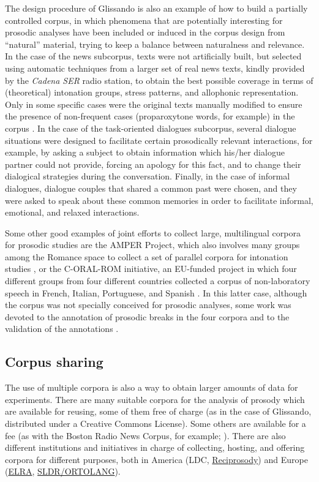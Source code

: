 \documentclass[output=paper]{langsci/langscibook}
\begin{document}
The design procedure of Glissando is also an example of how to build a partially controlled corpus, in which phenomena that are potentially interesting for prosodic analyses have been included or induced in the corpus design from ``natural'' material, trying to keep a balance between naturalness and relevance. In the case of the news subcorpus, texts were not artificially built, but selected using automatic techniques from a larger set of real news texts, kindly provided by the \textit{Cadena SER} radio station, to obtain the best possible coverage in terms of (theoretical) intonation groups, stress patterns, and allophonic representation. Only in some specific cases were the original texts manually modified to ensure the presence of non-frequent cases (proparoxytone words, for example) in the corpus \citep{Escudero2009,Escudero2010}. In the case of the task-oriented dialogues subcorpus, several dialogue situations were designed to facilitate certain prosodically relevant interactions, for example, by asking a subject to obtain information which his/her dialogue partner could not provide, forcing an apology for this fact, and to change their dialogical strategies during the conversation. Finally, in the case of informal dialogues, dialogue couples that shared a common past were chosen, and they were asked to speak about these common memories in order to facilitate informal, emotional, and relaxed interactions.

Some other good examples of joint efforts to collect large, multilingual corpora for prosodic studies are the AMPER Project, which also involves many groups among the Romance space to collect a set of parallel corpora for intonation studies \citep{Contini2002,Contini2003}, or the C-ORAL-ROM initiative, an EU-funded project in which four different groups from four different countries collected a corpus of non-laboratory speech in French, Italian, Portuguese, and Spanish \citep{Cresti2005}. In this latter case, although the corpus was not specially conceived for prosodic analyses, some work was devoted to the annotation of prosodic breaks in the four corpora and to the validation of the annotations \citep{Danieli2004,Danieli2005}.

\subsection{Corpus sharing}

The use of multiple corpora is also a way to obtain larger amounts of data for experiments. There are many suitable corpora for the analysis of prosody which are available for reusing, some of them free of charge (as in the case of Glissando, distributed under a Creative Commons License). Some others are available for a fee (as with the Boston Radio News Corpus, for example; \citealt{Ostendorf1995}). There are also different institutions and initiatives in charge of collecting, hosting, and offering corpora for different purposes, both in America (LDC, \href{https://github.com/fahmidur/reciprosody/blob/master/README.md}{Reciprosody}) and Europe (\href{http://www.elra.info/en/}{ELRA}, \href{http://www.sldr.fr/}{SLDR/ORTOLANG}).
\end{document}

